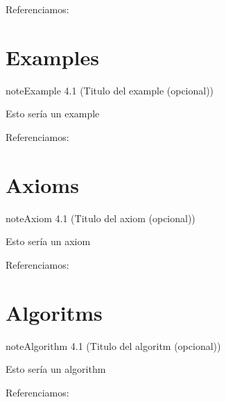 \documentclass[letterpaper,10pt,english]{jupyterBook}
\begin{document}
\sphinxAtStartPar
Referenciamos: {\hyperref[\detokenize{docs/04_00_Teoremas_pruebas_y_algoritmos:my-definition}]{}}


\section{Examples}
\label{\detokenize{docs/04_00_Teoremas_pruebas_y_algoritmos:examples}}\label{docs/04_00_Teoremas_pruebas_y_algoritmos:my-example}
\begin{sphinxadmonition}{note}{Example 4.1 (Titulo del example (opcional))}



\sphinxAtStartPar
Esto sería un example
\end{sphinxadmonition}

\sphinxAtStartPar
Referenciamos: {\hyperref[\detokenize{docs/04_00_Teoremas_pruebas_y_algoritmos:my-example}]{}}


\section{Axioms}
\label{\detokenize{docs/04_00_Teoremas_pruebas_y_algoritmos:axioms}}\label{docs/04_00_Teoremas_pruebas_y_algoritmos:my-axiom}
\begin{sphinxadmonition}{note}{Axiom 4.1 (Titulo del axiom (opcional))}



\sphinxAtStartPar
Esto sería un axiom
\end{sphinxadmonition}

\sphinxAtStartPar
Referenciamos: {\hyperref[\detokenize{docs/04_00_Teoremas_pruebas_y_algoritmos:my-axiom}]{}}


\section{Algoritms}
\label{\detokenize{docs/04_00_Teoremas_pruebas_y_algoritmos:algoritms}}\label{docs/04_00_Teoremas_pruebas_y_algoritmos:my-algorithm}
\begin{sphinxadmonition}{note}{Algorithm 4.1 (Titulo del algoritm (opcional))}



\sphinxAtStartPar
Esto sería un algorithm
\end{sphinxadmonition}

\sphinxAtStartPar
Referenciamos: {\hyperref[\detokenize{docs/04_00_Teoremas_pruebas_y_algoritmos:my-algorithm}]{}}
\end{document}
